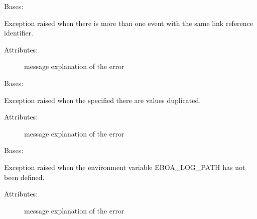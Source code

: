 \begin{fulllineitems}
\label{\detokenize{eboa.engine:eboa.engine.errors.DuplicatedEventLinkRef}}
Bases: {\hyperref[\detokenize{eboa.engine:eboa.engine.errors.Error}]{}}

Exception raised when there is more than one event with the same link reference identifier.
\begin{description}
\item[{Attributes:}] \leavevmode
message \textendash{} explanation of the error

\end{description}

\end{fulllineitems}


\begin{fulllineitems}
\label{\detokenize{eboa.engine:eboa.engine.errors.DuplicatedValues}}
Bases: {\hyperref[\detokenize{eboa.engine:eboa.engine.errors.Error}]{}}

Exception raised when the specified there are values duplicated.
\begin{description}
\item[{Attributes:}] \leavevmode
message \textendash{} explanation of the error

\end{description}

\end{fulllineitems}


\begin{fulllineitems}
\label{\detokenize{eboa.engine:eboa.engine.errors.EboaLogPathNotAvailable}}
Bases: {\hyperref[\detokenize{eboa.engine:eboa.engine.errors.Error}]{}}

Exception raised when the environment variable EBOA\_LOG\_PATH has not been defined.
\begin{description}
\item[{Attributes:}] \leavevmode
message \textendash{} explanation of the error

\end{description}

\end{fulllineitems}

